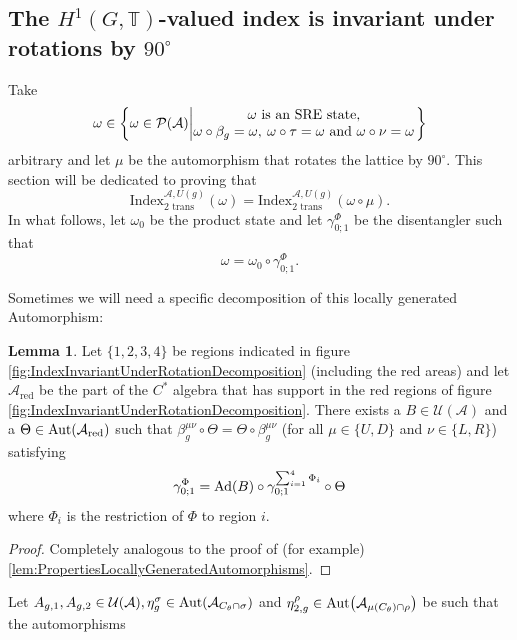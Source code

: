 \documentclass[12pt,a4paper,twoside]{article}
\let\originalleft\left
\let\originalright\right
\renewcommand{\left}{\mathopen{}\mathclose\bgroup\originalleft}
\renewcommand{\right}{\aftergroup\egroup\originalright}
\newcommand{\UU}{\mathcal U}
\newcommand{\PP}{\mathcal P}
\newcommand{\TT}{\mathbb T}
\renewcommand{\AA}{\mathcal A}
\newcommand{\Ad}[1]{\textrm{Ad}\left(#1\right)}
\newcommand{\Aut}[1]{\textrm{Aut}\left(#1\right)}
\theoremstyle{definition}
\newtheorem{lemma}[theorem]{Lemma}
\numberwithin{equation}{section}
\begin{document}
\subsection{The $H^1(G,\TT)$-valued index is invariant under rotations by $90^\circ$}
Take
\begin{equation}
	\omega\in\left\{\omega\in\PP(\AA)\left| \begin{matrix}\omega\text{ is an SRE state,}\\\omega\circ\beta_g=\omega,\:\omega\circ\tau=\omega\text{ and }\omega\circ\nu=\omega\end{matrix} \right.\right\}
\end{equation}
arbitrary and let $\mu$ be the automorphism that rotates the lattice by $90^\circ$. This section will be dedicated to proving that
\begin{equation}
	\textrm{Index}_{\text{2 trans}}^{\AA,U(g)}(\omega)=\textrm{Index}_{\text{2 trans}}^{\AA,U(g)}(\omega\circ\mu).
\end{equation}
In what follows, let $\omega_0$ be the product state and let $\gamma^\Phi_{0;1}$ be the disentangler such that
\begin{equation}
	\omega=\omega_0\circ\gamma^\Phi_{0;1}.
\end{equation}

Sometimes we will need a specific decomposition of this locally generated Automorphism:
\begin{lemma}\label{lem:DecompositionOfLGAInCross}
	Let $\{1,2,3,4\}$ be regions indicated in figure \ref{fig:IndexInvariantUnderRotationDecomposition} (including the red areas) and let $\AA_{\text{red}}$ be the part of the $C^*$ algebra that has support in the red regions of figure \ref{fig:IndexInvariantUnderRotationDecomposition}. There exists a $B\in\UU(\AA)$ and a $\Theta\in\Aut{\AA_{\text{red}}}$ such that $\beta^{\mu\nu}_g\circ\Theta=\Theta\circ\beta^{\mu\nu}_g$ (for all $\mu\in\{U,D\}$ and $\nu\in\{L,R\}$) satisfying
	\begin{equation}
		\gamma^\Phi_{0;1}=\Ad{B}\circ\gamma^{\sum_{i=1}^4\Phi_i}_{0;1}\circ\Theta
	\end{equation}
	where $\Phi_i$ is the restriction of $\Phi$ to region $i$.
\end{lemma}
\begin{proof}
	Completely analogous to the proof of (for example) \ref{lem:PropertiesLocallyGeneratedAutomorphisms}.
\end{proof}
Let $A_{g,1},A_{g,2}\in\UU(\AA),\eta^\sigma_g\in\Aut{\AA_{C_\theta\cap\sigma}}$ and $\eta^\rho_{2,g}\in\Aut{\AA_{\mu(C_\theta)\cap\rho}}$ be such that the automorphisms
\end{document}
